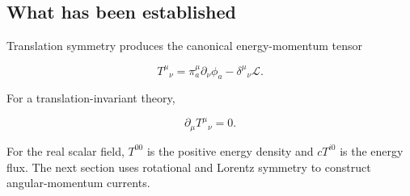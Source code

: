 \subsection{What has been established}

Translation symmetry produces the canonical energy-momentum tensor

\[
T^{\mu}{}_{\nu}
=
\pi_a^{\mu}\partial_{\nu}\phi_a
-
\delta^{\mu}{}_{\nu}\mathcal{L}.
\]

For a translation-invariant theory,

\[
\partial_{\mu}T^{\mu}{}_{\nu}=0.
\]

For the real scalar field, \(T^{00}\) is the positive energy density and \(cT^{i0}\) is the energy flux. The next section uses rotational and Lorentz symmetry to construct angular-momentum currents.
